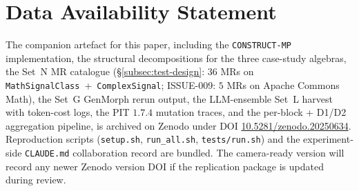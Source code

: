 \documentclass[manuscript]{acmart}
\begin{document}
\section*{Data Availability Statement}
The companion artefact for this paper, including the
\texttt{CONSTRUCT-MP} implementation, the structural decompositions for
the three case-study algebras, the Set~N MR catalogue
(\S\ref{subsec:test-design}: $36$ MRs on \texttt{MathSignalClass}~+~\texttt{ComplexSignal};
ISSUE-009: $5$ MRs on Apache Commons Math), the Set~G GenMorph rerun
output, the LLM-ensemble Set~L harvest with token-cost logs, the
PIT $1.7.4$ mutation traces, and the per-block + D1/D2 aggregation
pipeline, is archived on Zenodo under DOI
\href{https://doi.org/10.5281/zenodo.20250634}{10.5281/zenodo.20250634}.
Reproduction scripts (\texttt{setup.sh}, \texttt{run\_all.sh},
\texttt{tests/run.sh}) and the experiment-side \texttt{CLAUDE.md}
collaboration record are bundled. The camera-ready version will record any
newer Zenodo version DOI if the replication package is updated during review.
\end{document}
